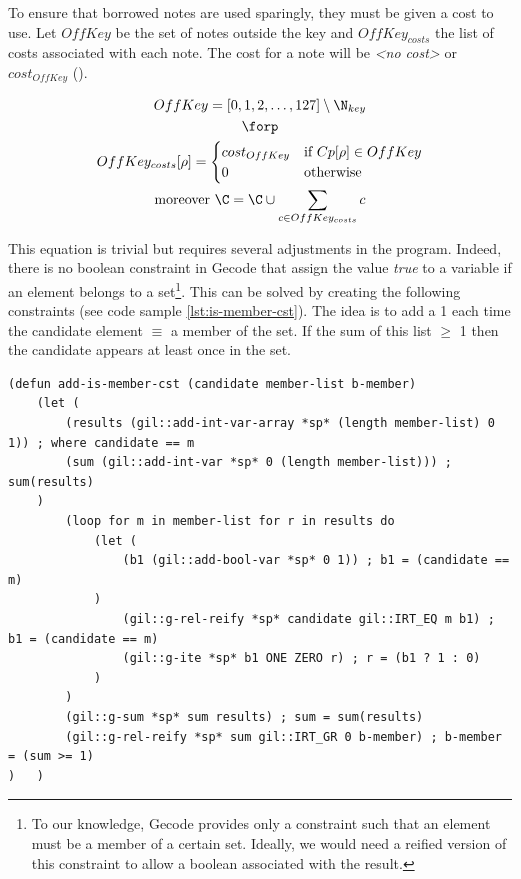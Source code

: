To ensure that borrowed notes are used sparingly, they must be given a cost to use. Let $OffKey$ be the set of notes outside the key and $OffKey_{costs}$ the list of costs associated with each note. The cost for a note will be \textit{<no cost>} or $cost_{OffKey}$ ().

\begin{equation}
    \begin{gathered}
        OffKey = [0, 1, 2, \dots, 127] \setminus \N_{key}\\
        \forp\\
        OffKey_{costs}[\rho] = \begin{cases}
            cost_{OffKey} & \text{if } Cp[\rho] \in OffKey \\
            0 & \text{otherwise}
        \end{cases}\\
        \text{moreover } \C = \C \cup \sum _{c \in OffKey_{costs}} c
    \end{gathered}
\end{equation}

This equation is trivial but requires several adjustments in the program. Indeed, there is no boolean constraint in Gecode that assign the value \emph{true} to a variable if an element belongs to a set\footnote{To our knowledge, Gecode provides only a constraint such that an element must be a member of a certain set. Ideally, we would need a reified version of this constraint to allow a boolean associated with the result.}. This can be solved by creating the following constraints (see code sample \ref{lst:is-member-cst}). The idea is to add a 1 each time the candidate element $\equiv$ a member of the set. If the sum of this list $\geq$ 1 then the candidate appears at least once in the set.

\begin{lstlisting}[caption=Function that constrains b-member to be true if candidate is in member-list., label=lst:is-member-cst, basicstyle=\ttfamily\scriptsize]
(defun add-is-member-cst (candidate member-list b-member)
    (let (
        (results (gil::add-int-var-array *sp* (length member-list) 0 1)) ; where candidate == m
        (sum (gil::add-int-var *sp* 0 (length member-list))) ; sum(results)
    )
        (loop for m in member-list for r in results do
            (let (
                (b1 (gil::add-bool-var *sp* 0 1)) ; b1 = (candidate == m)
            )
                (gil::g-rel-reify *sp* candidate gil::IRT_EQ m b1) ; b1 = (candidate == m)
                (gil::g-ite *sp* b1 ONE ZERO r) ; r = (b1 ? 1 : 0)
            )
        )
        (gil::g-sum *sp* sum results) ; sum = sum(results)
        (gil::g-rel-reify *sp* sum gil::IRT_GR 0 b-member) ; b-member = (sum >= 1)
)   )
\end{lstlisting}

